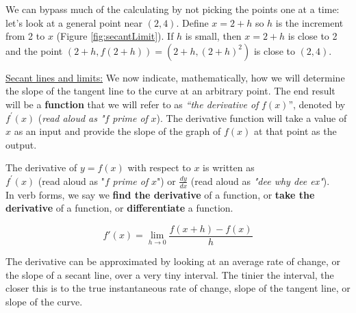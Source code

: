 \noindent We can bypass much of the calculating by not picking the points one at a time:  let's look at a general point near $(2,4)$.  Define  $x = 2 + h$  so $h$ is the increment from 2 to  $x$  (Figure \ref{fig:secantLimit}).  If $h$ is small, then $x = 2 + h$ is close to  2 and the point  $(2+h, f(2+h)) = (2+h, (2+h)^2 )$  is close to $(2,4)$.  
\hfill \break
\hfill \break
\hfill \break
\hfill \break
\hfill \break
\hfill \break




\noindent \underline{Secant lines and limits:}  We now indicate, mathematically, how we will determine the slope of the tangent line to the curve at an arbitrary point.  The end result will be a \textbf{function} that we will refer to as \emph{“the derivative of} $f(x)$”, denoted by $f^\prime (x)$ (\emph{read aloud as "}$f$ \emph{prime of} $x$).  The derivative function will take a value of $x$ as an input and provide the slope of the graph of $f(x)$ at that point as the output. \\

\begin{tcolorbox}[title = {Notation of Derivatives}]
The derivative of \(y = f(x)\) with respect to \(x\) is written as\\
$f^\prime (x)$ (read aloud as "$f$ \emph{prime of} $x$") or \(\displaystyle\frac{dy}{dx}\) (read aloud as \emph{"dee why dee ex"}). \\
In verb forms, we say we \textbf{find the derivative} of a function, or \textbf{take the derivative} of a function, or \textbf{differentiate} a function.
\end{tcolorbox}

\vspace{0.25cm}

\begin{tcolorbox}[title = {Formal Algebraic Definition of Derivatives}]
\begin{equation}\label{eq:dervLimit}
f'(x)=\lim\limits_{h \to 0} \displaystyle\frac{f(x+h)-f(x)}{h}
\end{equation} 
\end{tcolorbox}

\vspace{0.25cm}

\begin{tcolorbox}[title = {Practical Definition of Derivatives}]
The derivative can be approximated by looking at an average rate of change, or the slope of a secant line, 
over a very tiny interval.  The tinier the interval, the closer this is to the true instantaneous rate of change, slope of the tangent line, or slope of the curve.

\end{tcolorbox}
\newpage

